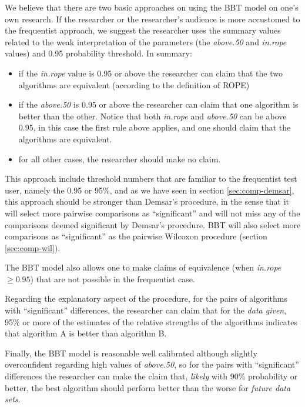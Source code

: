 \documentclass[twoside,11pt,preprint]{article}
\begin{document}
We believe that there are two basic approaches on using the BBT model
on one's own research. If the researcher or the researcher's audience is
more accustomed to the frequentist approach, we suggest the researcher uses the
summary values related to the weak interpretation of the parameters
(the {\em above.50} and {\em in.rope} values) and 0.95 probability
threshold. In summary:

\begin{itemize}
\item
  if the {\em in.rope} value is 0.95 or above the researcher can
  claim that the two algorithms are equivalent (according to the
  definition of ROPE)
\item
  if the {\em above.50} is 0.95 or above the researcher can claim
  that one algorithm is better than the other. Notice that both
  {\em in.rope} and {\em above.50} can be above 0.95, in this case
  the first rule above applies, and one should claim that the
  algorithms are equivalent.
\item
  for all other cases, the researcher should make no claim.
\end{itemize}

This approach include threshold numbers that are familiar to the
frequentist test user, namely the 0.95 or 95\%, and as we have seen in
section \ref{sec:comp-demsar}, this approach should be stronger than
Demsar's procedure, in the sense that it will select more pairwise
comparisons as ``significant'' and will not miss any of the comparisons
deemed significant by Demsar's procedure. BBT will also select more
comparisons as ``significant'' as the pairwise Wilcoxon procedure
(section \ref{sec:comp-wil}).

The BBT model also allows one to make claims of equivalence (when
{\em in.rope} \(\ge 0.95\)) that are not possible in the frequentist
case.

Regarding the explanatory aspect of the procedure, for the pairs of
algorithms with ``significant'' differences, the researcher can claim
that for the \emph{data given}, 95\% or more of the estimates of the
relative strengths of the algorithms indicates that algorithm A is
better than algorithm B.

Finally, the BBT model is reasonable well calibrated although slightly
overconfident regarding high values of {\em above.50}, so for the
pairs with ``significant'' differences the researcher can make the claim
that, \emph{likely} with 90\% probability or better, the best algorithm
should perform better than the worse for \emph{future data sets}.
\end{document}
